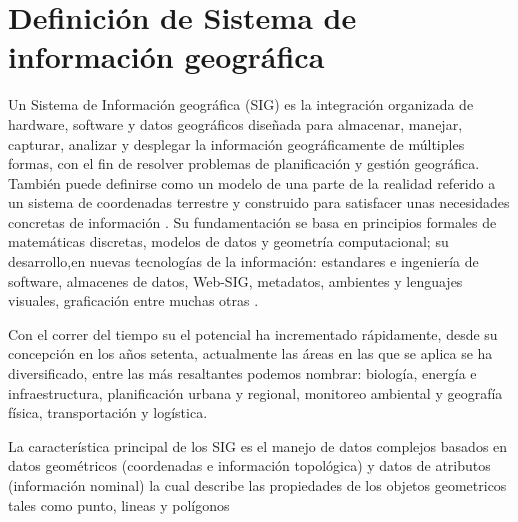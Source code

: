 \section{Definición de Sistema de información geográfica}
\label{sec:cap2-definicion-sig}

Un Sistema de Información geográfica (SIG) es la integración organizada de hardware, software y datos geográficos
diseñada para almacenar, manejar, capturar, analizar y desplegar la información geográficamente de múltiples
formas, con el fin de resolver problemas de planificación y gestión geográfica. También puede definirse como un
modelo de una parte de la realidad referido a un sistema de coordenadas terrestre y construido para satisfacer 
unas necesidades concretas de información \cite{lopezMarcos2007}. Su fundamentación se basa en principios formales
de matemáticas discretas, modelos de datos y geometría computacional; su desarrollo,en nuevas tecnologías de la
información: estandares e ingeniería de software, almacenes de datos, Web-SIG, metadatos, ambientes y lenguajes
visuales, graficación entre muchas otras \cite{lunaPaulina2010}.

Con el correr del tiempo su el potencial ha incrementado rápidamente, desde su concepción en los años setenta,
actualmente las áreas en las que se aplica se ha diversificado, entre las más resaltantes podemos nombrar: biología, energía e infraestructura, planificación urbana y regional, monitoreo ambiental y geografía física,
transportación y logística.

La característica principal de los SIG es el manejo de datos complejos basados en datos geométricos (coordenadas e
información topológica) y datos de atributos (información nominal) la cual describe las propiedades de los objetos
geometricos tales como punto, lineas y polígonos
